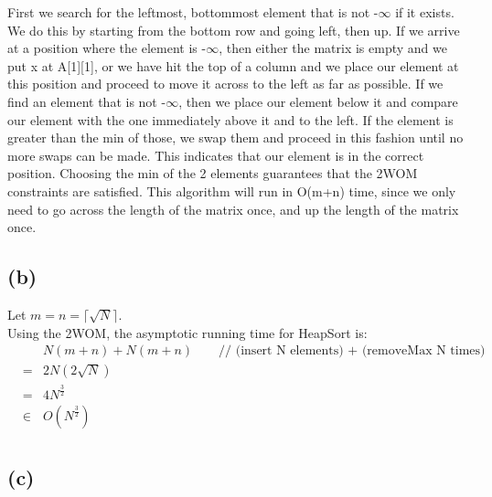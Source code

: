 \documentclass{article}[12pt]
\begin{document}
First we search for the leftmost, bottommost element that is not -$\infty$ if it exists. We do this by starting from the bottom row and going left, then up. If we arrive at a position where the element is -$\infty$, then either the matrix is empty and we put x at A[1][1], or we have hit the top of a column and we place our element at this position and proceed to move it across to the left as far as possible. If we find an element that is not -$\infty$, then we place our element below it and compare our element with the one immediately above it and to the left. If the element is greater than the min of those, we swap them and proceed in this fashion until no more swaps can be made. This indicates that our element is in the correct position. Choosing the min of the 2 elements guarantees that the 2WOM constraints are satisfied. This algorithm will run in O(m+n) time, since we only need to go across the length of the matrix once, and up the length of the matrix once. \\ 

\subsection*{(b)}
Let $m = n = \lceil \sqrt{N} \rceil$. \\
Using the 2WOM, the asymptotic running time for HeapSort is: \\
\begin{eqnarray*}
  & & N(m+n) + N(m+n) \qquad \textrm{// (insert N elements) + (removeMax N times)} \\
  & = &  2N(2\sqrt{N}) \\
  & = & 4N^{\frac{3}{2}} \\
  & \in & O(N^{\frac{3}{2}}) \\
\end{eqnarray*}

\subsection*{(c)}
\end{document}
